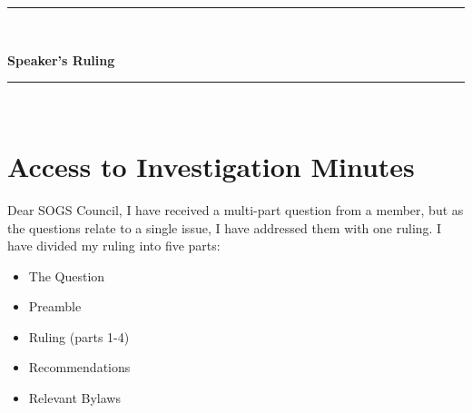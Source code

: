 \begin{center}
\rule{\textwidth}{3.6pt}\\[\baselineskip] %
\begin{Huge}
\textbf{Speaker's Ruling}
\end{Huge}

\rule{\textwidth}{3.6pt}\\[\baselineskip] %



\vspace*{2\baselineskip} %
\end{center}
\section*{Access to Investigation Minutes}




Dear SOGS Council,
I have received a multi-part question from a member, but as the questions relate to a single issue, I have addressed them with one ruling. I have divided my ruling into five parts:
\begin{itemize}
\item The Question
\item Preamble
\item Ruling (parts 1-4)
\item Recommendations
\item Relevant Bylaws
\end{itemize}



